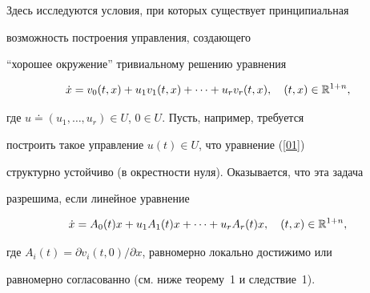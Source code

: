 \date{}







\pagestyle{plain} %













\maketitle


\label{begin}





Здесь исследуются условия, при которых существует принципиальная


возможность построения управления, создающего


``хорошее окружение'' тривиальному решению уравнения


\begin{equation}


\label{01}


\Dot x=v_0(t,x)+u_1v_1(t,x)+\dotsb+u_ rv_r(t,x),\quad (t,x)\in\R^{1+n},


\end{equation}


где $u\doteq(u_1,\dotsc,u_r)\in U$, $0\in U$. Пусть, например, требуется


построить такое управление $u(t)\in U$, что уравнение (\ref{01})


структурно устойчиво (в окрестности нуля). Оказывается, что эта задача


разрешима, если линейное уравнение


\begin{equation}


\label{02}


\Dot x=A_0(t)x+u_1A_1(t)x+\dotsb+u_r A_r(t)x,\quad (t,x)\in\R^{1+n},


\end{equation}


где $A_i(t)=\partial v_i(t,0)/\partial x$, равномерно локально достижимо или


равномерно согласованно (см. ниже теорему~1 и следствие~1).


